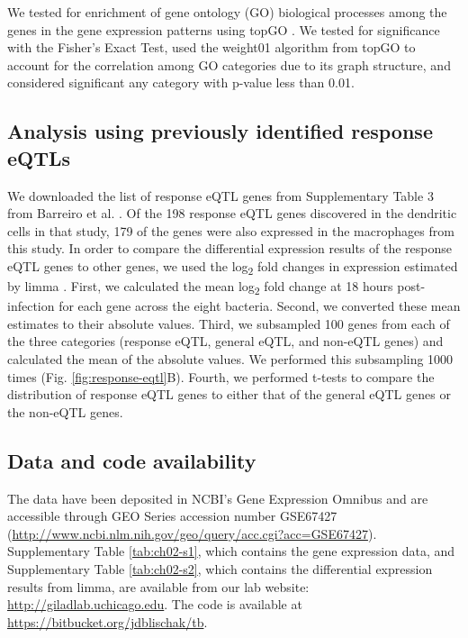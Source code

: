We tested for enrichment of gene ontology (GO) biological processes
among the genes in the gene expression patterns using topGO
\citep{Alexa2006}. We tested for significance with the Fisher's Exact
Test, used the weight01 algorithm from topGO to account for the
correlation among GO categories due to its graph structure, and
considered significant any category with p-value less than 0.01.

\subsection{Analysis using previously identified response
eQTLs}\label{analysis-using-previously-identified-response-eqtls}

We downloaded the list of response eQTL genes from Supplementary Table
3 from Barreiro et al. \citep{Barreiro2012}. Of the 198 response eQTL
genes discovered in the dendritic cells in that study, 179 of the
genes were also expressed in the macrophages from this study. In order
to compare the differential expression results of the response eQTL
genes to other genes, we used the log\textsubscript{2} fold changes in
expression estimated by limma \citep{Ritchie2015}. First, we
calculated the mean log\textsubscript{2} fold change at 18 hours
post-infection for each gene across the eight bacteria. Second, we
converted these mean estimates to their absolute values. Third, we
subsampled 100 genes from each of the three categories (response eQTL,
general eQTL, and non-eQTL genes) and calculated the mean of the
absolute values. We performed this subsampling 1000 times
(Fig. \ref{fig:response-eqtl}B). Fourth, we performed t-tests to
compare the distribution of response eQTL genes to either that of the
general eQTL genes or the non-eQTL genes.

\subsection{Data and code
availability}\label{ch02-data-and-code-availability}

The data have been deposited in NCBI's Gene Expression Omnibus
\citep{Edgar2002} and are accessible through GEO Series accession
number GSE67427
(\url{http://www.ncbi.nlm.nih.gov/geo/query/acc.cgi?acc=GSE67427}).
Supplementary Table \ref{tab:ch02-s1}, which contains the gene
expression data, and Supplementary Table \ref{tab:ch02-s2}, which
contains the differential expression results from limma, are available
from our lab website: \url{http://giladlab.uchicago.edu}. The code is
available at \url{https://bitbucket.org/jdblischak/tb}.

